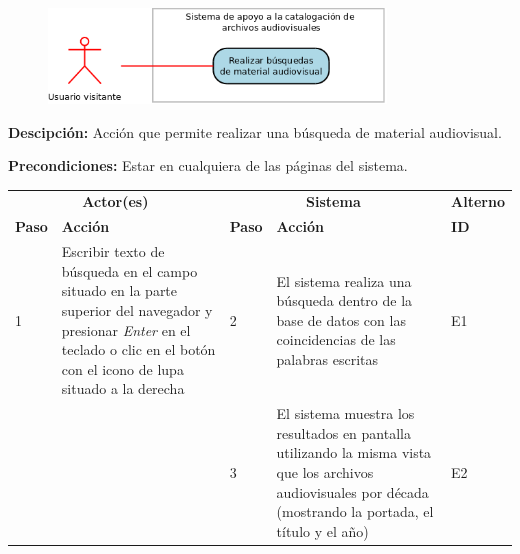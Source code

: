 \documentclass[10pt,letterpaper]{article}
\begin{document}
\begin{figure}[H]
	\centering
	\includegraphics[width=0.8\textwidth]{CasoDeUso_Visitante_Busqueda.png}
\end{figure}

\textbf{Descipción: } Acción que permite realizar una búsqueda de material audiovisual.

\textbf{Precondiciones:} Estar en cualquiera de las páginas del sistema.

\begin{adjustwidth}{-6em}{-6em}
	\begin{center}
		\begin{tabularx}{1.2\textwidth}{ | p{0.7cm} | X | p{0.7cm} | X | p{1.5cm} | }
			\hline
			\rowcolor{NewBlue} \multicolumn{5}{|c|}{\textbf{Flujo normal de eventos}} \\
			\hline
			\multicolumn{2}{|c|}{\textbf{Actor(es)}}	&	\multicolumn{2}{c|}{\textbf{Sistema}}	&	\textbf{Alterno} \\
			\hline
			\textbf{Paso}	&	\textbf{Acción}	&	\textbf{Paso}	&	\textbf{Acción}	&	\textbf{ID} \\
			\hline
			1 & 
			Escribir texto de búsqueda en el campo situado en la parte superior del navegador y presionar \textit{Enter} en el teclado o clic en el botón con el icono de lupa situado a la derecha &
			2 &
			El sistema realiza una búsqueda dentro de la base de datos con las coincidencias de las palabras escritas &
			E1 \\
			\hline
			& 
			&
			3 &
			El sistema muestra los resultados en pantalla utilizando la misma vista que los archivos audiovisuales por década (mostrando la portada, el título y el año) & 
			E2\\
			\hline
		\end{tabularx}
	\end{center}
\end{adjustwidth}
\end{document}
